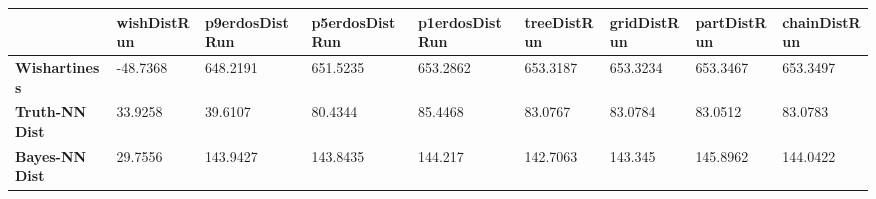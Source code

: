 \begin{tabular}{|l|l|l|l|l|l|l|l|l|}
\hline
&\textbf{wishDistRun}&\textbf{p9erdosDistRun}&\textbf{p5erdosDistRun}&\textbf{p1erdosDistRun}&\textbf{treeDistRun}&\textbf{gridDistRun}&\textbf{partDistRun}&\textbf{chainDistRun}\\\hline
\textbf{Wishartiness}&-48.7368&648.2191&651.5235&653.2862&653.3187&653.3234&653.3467&653.3497\\\hline
\textbf{Truth-NN Dist}&33.9258&39.6107&80.4344&85.4468&83.0767&83.0784&83.0512&83.0783\\\hline
\textbf{Bayes-NN Dist}&29.7556&143.9427&143.8435&144.217&142.7063&143.345&145.8962&144.0422\\\hline
\end{tabular}
